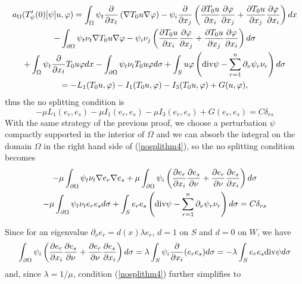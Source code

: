 \documentclass[a4paper,reqno,11pt,oneside]{amsart}
\theoremstyle{plain}
\theoremstyle{plain}
\theoremstyle{plain}
\theoremstyle{remark}
\def\div{\textup{div}}
\begin{document}
\begin{multline}\label{condthm4}
    a_\Omega  (T_\psi '(0)[\psi] u,\varphi)=
   \int_\Omega\psi_t \frac{\partial}{\partial x_t} \left(\nabla T_0u\nabla \varphi\right) - \psi_i\frac{\partial }{ \partial x_j}\left(\frac{\partial T_0u}{\partial x_i}\frac{\partial \varphi}{\partial x_j}+
\frac{\partial T_0u}{\partial x_j}\frac{\partial \varphi}{\partial x_i}
\right) dx\\ 
-    \int_{\partial\Omega}\psi_t \nu_t \nabla T_0u\nabla \varphi -
\psi_i \nu_j\left(\frac{\partial T_0u}{\partial x_i}\frac{\partial \varphi}{\partial x_j}+\frac{\partial T_0u}{\partial x_j}\frac{\partial \varphi}{\partial x_i}
\right) d\sigma\\
+ \int_\Omega \psi_t \frac{\partial}{\partial x_t}  T_0u \varphi  dx
-\int_{\partial\Omega}\psi_t \nu_t  T_0u \varphi d\sigma
 +\int_{S}  u\varphi \left(\div \psi -\sum_{r=1}^n \partial_\nu \psi_r \nu_r\right)d\sigma  \\
    =-L_1( T_0u, \varphi)-
I_1( T_0u, \varphi)
-I_3(T_0 u, \varphi)+G(u,\varphi),
\end{multline}
thus the no splitting condition is
\begin{equation}\label{nosplithm4}
-\mu L_1( e_r, e_s)-
\mu I_1( e_r, e_s)
-\mu I_3(e_r, e_s)+G(e_r, e_s)=C \delta_{rs}    
\end{equation}
With the same strategy of the previous proof, we choose a perturbation $\psi$ compactly supported in the interior of $\Omega$ and we can absorb the integral on the domain $\Omega$  in the right hand side of (\ref{nosplithm4}), so the no splitting condition becomes
\begin{multline}
-  \mu  \int_{\partial\Omega}\psi_t \nu_t \nabla e_r \nabla e_s + \mu  \int_{\partial\Omega}
\psi_i \left(\frac{\partial e_r}{\partial x_i}\frac{\partial e_s}{\partial \nu}+\frac{\partial e_r}{\partial \nu}\frac{\partial e_s}{\partial x_i}
\right) d\sigma\\
-\mu \int_{\partial\Omega}\psi_t \nu_t  e_re_s d\sigma
 +\int_{S}  e_r e_s \left(\div \psi -\sum_{r=1}^n \partial_\nu \psi_r \nu_r\right)d\sigma  =C \delta_{rs}    
\end{multline}

Since for an eigenvalue $\partial_\nu e_r=d(x)\lambda e_r$, $d=1$ on $S$ and $d=0$ on $W$, we have
\begin{equation*}
    \int_{\partial\Omega}
\psi_i \left(\frac{\partial e_r}{\partial x_i}\frac{\partial e_s}{\partial \nu}+\frac{\partial e_r}{\partial \nu}\frac{\partial e_s}{\partial x_i}
\right) d\sigma=
\lambda \int_{S}
\psi_i  \frac{\partial }{\partial x_i}(e_r e_s) d\sigma=-\lambda \int_{S}e_r e_s
\div\psi d\sigma
\end{equation*} 
and, since $\lambda =1/\mu$, condition (\ref{nosplithm4}) further simplifies to 
\end{document}
